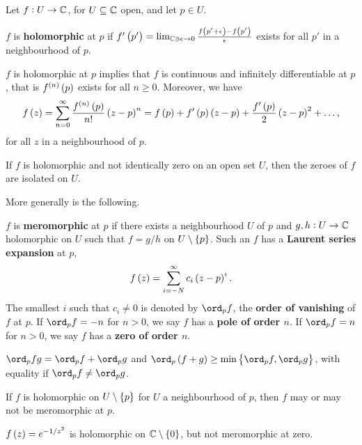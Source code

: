 Let $ f : U \to \mathbb{C} $, for $ U \subseteq \mathbb{C} $ open, and let $ p \in U $.

\begin{definition}
$ f $ is \textbf{holomorphic} at $ p $ if $ f'\br{p'} = \lim_{\CC \ni \epsilon \to 0} \tfrac{f\br{p' + \epsilon} - f\br{p'}}{\epsilon} $ exists for all $ p' $ in a neighbourhood of $ p $.
\end{definition}

\begin{proposition}
$ f $ is holomorphic at $ p $ implies that $ f $ is continuous and infinitely differentiable at $ p $, that is $ f^{\br{n}}\br{p} $ exists for all $ n \ge 0 $. Moreover, we have
$$ f\br{z} = \sum_{n = 0}^\infty \dfrac{f^{\br{n}}\br{p}}{n!}\br{z - p}^n = f\br{p} + f'\br{p}\br{z - p} + \dfrac{f'\br{p}}{2}\br{z - p}^2 + \dots, $$
for all $ z $ in a neighbourhood of $ p $.
\end{proposition}

\begin{corollary}
If $ f $ is holomorphic and not identically zero on an open set $ U $, then the zeroes of $ f $ are isolated on $ U $.
\end{corollary}

More generally is the following.

\begin{definition}
$ f $ is \textbf{meromorphic} at $ p $ if there exists a neighbourhood $ U $ of $ p $ and $ g, h : U \to \mathbb{C} $ holomorphic on $ U $ such that $ f = g / h $ on $ U \setminus \cbr{p} $. Such an $ f $ has a \textbf{Laurent series expansion} at $ p $,
$$ f\br{z} = \sum_{i = -N}^\infty c_i\br{z - p}^i. $$
The smallest $ i $ such that $ c_i \ne 0 $ is denoted by $ \ord_p f $, the \textbf{order of vanishing} of $ f $ at $ p $. If $ \ord_p f = -n $ for $ n > 0 $, we say $ f $ has a \textbf{pole of order $ n $}. If $ \ord_p f = n $ for $ n > 0 $, we say $ f $ has a \textbf{zero of order $ n $}.
\end{definition}

\begin{proposition}
$ \ord_p fg = \ord_p f + \ord_p g $ and $ \ord_p \br{f + g} \ge \min\cbr{\ord_p f, \ord_p g} $, with equality if $ \ord_p f \ne \ord_p g $.
\end{proposition}

If $ f $ is holomorphic on $ U \setminus \cbr{p} $ for $ U $ a neighbourhood of $ p $, then $ f $ may or may not be meromorphic at $ p $.

\begin{example*}
$ f\br{z} = e^{-1 / z^2} $ is holomorphic on $ \CC \setminus \cbr{0} $, but not meromorphic at zero.
\end{example*}

